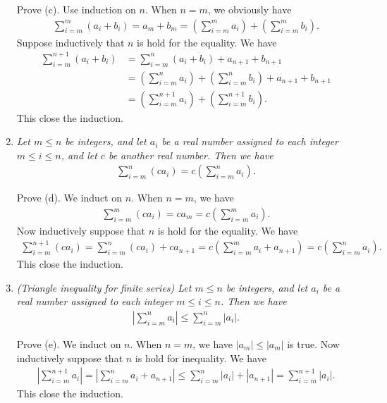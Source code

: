 \documentclass{book}
\begin{document}
\begin{enumerate}
    Prove (c). Use induction on $n$. When $n=m$, we obviously have
    \begin{align*}
        \sum_{i=m}^m(a_i+b_i)=a_m+b_m=\left(\sum_{i=m}^ma_i\right)+\left(\sum_{i=m}^mb_i\right).
    \end{align*}
    Suppose inductively that $n$ is hold for the equality. We have
    \begin{align*}
        \sum_{i=m}^{n+1}(a_i+b_i)&=\sum_{i=m}^{n}(a_i+b_i)+a_{n+1}+b_{n+1}\\
        &=\left(\sum_{i=m}^na_i\right)+\left(\sum_{i=m}^nb_i\right)+a_{n+1}+b_{n+1}\\
        &=\left(\sum_{i=m}^{n+1}a_i\right)+\left(\sum_{i=m}^{n+1}b_i\right).
    \end{align*}
    This close the induction.

    \item \emph{Let $m\leq n$ be integers, and let $a_i$ be a real number assigned to each integer $m\leq i\leq n$, and let $c$ be another real number. Then we have}
    \begin{align*}
        \sum_{i=m}^n(ca_i)=c\left(\sum_{i=m}^na_i\right).
    \end{align*}

    Prove (d). We induct on $n$. When $n=m$, we have
    \begin{align*}
        \sum_{i=m}^m(ca_i)=ca_m=c\left(\sum_{i=m}^ma_i\right).
    \end{align*}
    Now inductively suppose that $n$ is hold for the equality. We have
    \begin{align*}
        \sum_{i=m}^{n+1}(ca_i)=\sum_{i=m}^n(ca_i)+ca_{n+1}=c\left(\sum_{i=m}^ma_i+a_{n+1}\right)=c\left(\sum_{i=m}^na_i\right).
    \end{align*}
    This close the induction.

    \item \emph{(Triangle inequality for finite series) Let $m\leq n$ be integers, and let $a_i$ be a real number assigned to each integer $m\leq i\leq n$. Then we have}
    \begin{align*}
        \left|\sum_{i=m}^na_i\right|\leq\sum_{i=m}^n|a_i|.
    \end{align*}

    Prove (e). We induct on $n$. When $n=m$, we have $|a_m|\leq|a_m|$ is true. Now inductively suppose that $n$ is hold for inequality. We have
    \begin{align*}
        \left|\sum_{i=m}^{n+1}a_i\right|=\left|\sum_{i=m}^{n}a_i+a_{n+1}\right|\leq\sum_{i=m}^{n}|a_i|+|a_{n+1}|=\sum_{i=m}^{n+1}|a_i|.
    \end{align*}
    This close the induction.


\end{enumerate}
\end{document}
